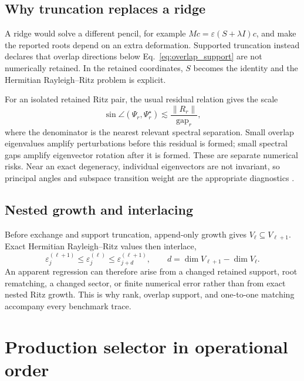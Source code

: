 \documentclass[
  reprint,
  amsmath,
  amssymb,
  aps,
  pra,
  nofootinbib,
  superscriptaddress,
  floatfix
]{revtex4-2}
\begin{document}
\subsection{Why truncation replaces a ridge}

A ridge would solve a different pencil, for example
$M c=\varepsilon(S+\lambda I)c$, and make the reported roots depend on an
extra deformation.  Supported truncation instead declares that overlap
directions below Eq.~\eqref{eq:overlap_support} are not numerically retained.
In the retained coordinates, $S$ becomes the identity and the Hermitian
Rayleigh--Ritz problem is explicit.

For an isolated retained Ritz pair, the usual residual relation gives the
scale
\begin{equation}
 \sin\angle(\Psi_r,\Psi_r^\star)
 \lesssim
 \frac{\|R_r\|}{\operatorname{gap}_r},
 \label{eq:residual_gap_scale}
\end{equation}
where the denominator is the nearest relevant spectral separation.  Small
overlap eigenvalues amplify perturbations before this residual is formed;
small spectral gaps amplify eigenvector rotation after it is formed.  These
are separate numerical risks.  Near an exact degeneracy, individual
eigenvectors are not invariant, so principal angles and subspace transition
weight are the appropriate diagnostics \cite{DavisKahan1970}.

\subsection{Nested growth and interlacing}

Before exchange and support truncation, append-only growth gives
$V_{\ell}\subseteq V_{\ell+1}$.  Exact Hermitian Rayleigh--Ritz values then
interlace,
\begin{equation}
 \varepsilon_j^{(\ell+1)}
 \leq\varepsilon_j^{(\ell)}
 \leq\varepsilon_{j+d}^{(\ell+1)},
 \qquad
 d=\dim V_{\ell+1}-\dim V_\ell.
 \label{eq:ritz_interlacing}
\end{equation}
An apparent regression can therefore arise from a changed retained support,
root rematching, a changed sector, or finite numerical error rather than from
exact nested Ritz growth.  This is why rank, overlap support, and one-to-one
matching accompany every benchmark trace.

\section{Production selector in operational order}
\label{app:selector_contract}
\end{document}
